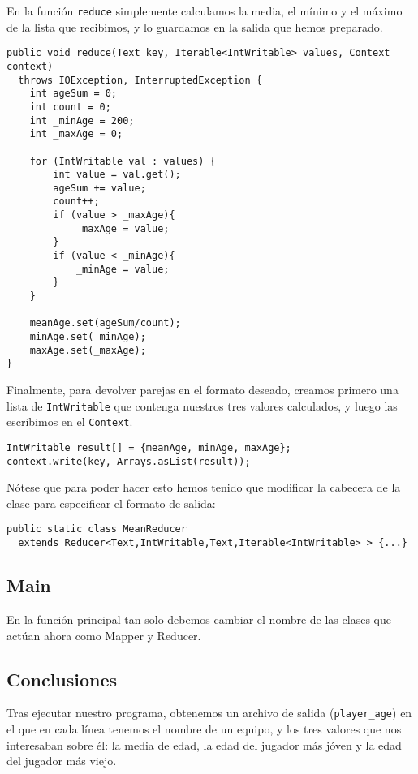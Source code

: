 \documentclass[11pt]{article}
\begin{document}
En la función \verb|reduce| simplemente calculamos la media, el mínimo y el máximo de la lista que recibimos, y lo guardamos en la salida que hemos preparado.

\begin{verbatim}
public void reduce(Text key, Iterable<IntWritable> values, Context context)
  throws IOException, InterruptedException {
    int ageSum = 0;
    int count = 0;
    int _minAge = 200;
    int _maxAge = 0;

    for (IntWritable val : values) {
        int value = val.get();
        ageSum += value;
        count++;
        if (value > _maxAge){
            _maxAge = value;
        }
        if (value < _minAge){
            _minAge = value;
        }
    }

    meanAge.set(ageSum/count);
    minAge.set(_minAge);
    maxAge.set(_maxAge);
}
\end{verbatim}

Finalmente, para devolver parejas en el formato deseado, creamos primero una lista de \verb|IntWritable| que contenga nuestros tres valores calculados, y luego las escribimos en el \verb|Context|.

\begin{verbatim}
IntWritable result[] = {meanAge, minAge, maxAge};
context.write(key, Arrays.asList(result));
\end{verbatim}

Nótese que para poder hacer esto hemos tenido que modificar la cabecera de la clase para especificar el formato de salida:

\begin{verbatim}
public static class MeanReducer
  extends Reducer<Text,IntWritable,Text,Iterable<IntWritable> > {...}
\end{verbatim}

\subsection*{Main}

En la función principal tan solo debemos cambiar el nombre de las clases que actúan ahora como Mapper y Reducer.

\subsection{Conclusiones}

Tras ejecutar nuestro programa, obtenemos un archivo de salida (\verb|player_age|) en el que en cada línea tenemos el nombre de un equipo, y los tres valores que nos interesaban sobre él: la media de edad, la edad del jugador más jóven y la edad del jugador más viejo.\\
\end{document}
